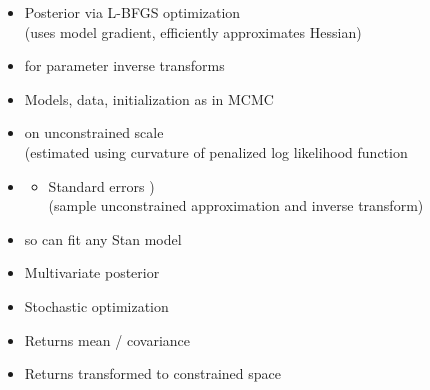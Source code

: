 \documentclass[10pt]{report}
\begin{document}
%
\begin{itemize}
\item Posterior  via L-BFGS optimization
  \\ {\footnotesize (uses model gradient, efficiently approximates Hessian)}
\item {} for parameter inverse transforms
\item Models, data, initialization as in MCMC
  \vfill
  \item  {} on unconstrained scale
    \\
    {\footnotesize  (estimated using curvature of penalized log likelihood function}
\item {}
  \vspace*{-4pt}
  \begin{itemize}\small
  \item Standard errors )
    \\
    {\footnotesize  (sample unconstrained approximation and inverse transform)}
  \end{itemize}      
\end{itemize}


%
\begin{itemize}
\item {} so can fit any Stan model
\item Multivariate  posterior
\item Stochastic  optimization
\item Returns  mean / covariance
\item Returns  transformed to constrained space
\end{itemize}
\end{document}
